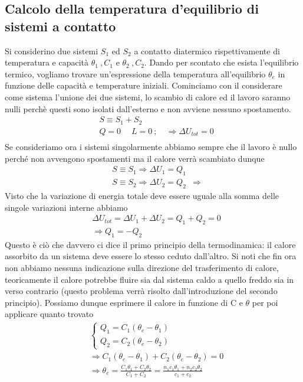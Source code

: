 \documentclass[10pt,a4paper]{article}
\begin{document}
\subsection{Calcolo della temperatura d'equilibrio di sistemi a contatto}
Si considerino due sistemi $S_1$ ed $S_2$ a contatto diatermico rispettivamente di temperatura e capacità $\theta_1\ , C_1$ e  $\theta_2\ , C_2$. Dando per scontato che esista l'equilibrio termico, vogliamo trovare un'espressione della temperatura all'equilibrio $\theta_e$ in funzione delle capacità e temperature iniziali. Cominciamo con il considerare come sistema l'unione dei due sistemi, lo scambio di calore ed il lavoro saranno nulli perchè questi sono isolati dall'esterno e non avviene nessuno spostamento. 
\begin{align*} 
&S \equiv S_1 + S_2\\
&Q = 0\;\quad L=0\ ; \quad \Rightarrow \Delta U_{tot} = 0\\
\end{align*} 
Se consideriamo ora i sistemi singolarmente abbiamo sempre che il lavoro è nullo perché non avvengono spostamenti ma il calore verrà scambiato dunque
\begin{align*} 
&S \equiv S_1 \Rightarrow \Delta U_1 = Q_1\\
&S\equiv S_2 \Rightarrow  \Delta U_2 = Q_2
&\Rightarrow 
\end{align*} 
Visto che la variazione di energia totale deve essere uguale alla somma delle singole variazioni interne abbiamo
\begin{align*} 
&\Delta U_{tot} = \Delta U_1 + \Delta U_2 = Q_1+Q_2 = 0\\
&\Rightarrow Q_1 = -Q_2 
\end{align*}  
Questo è ciò che davvero ci dice il primo principio della termodinamica: il calore assorbito da un sistema deve essere lo stesso ceduto dall'altro. Si noti che fin ora non abbiamo nessuna indicazione sulla direzione del trasferimento di calore, teoricamente il calore potrebbe fluire sia dal sistema caldo a quello freddo sia in verso contrario (questo problema verrà risolto dall'introduzione del secondo principio). Possiamo dunque esprimere il calore in funzione di C e $\theta$ per poi applicare quanto trovato
\begin{align*} 
&\begin{cases}
	Q_1 = C_1 (\theta_e-\theta_1)\\
	Q_2 = C_2 (\theta_e-\theta_2)
\end{cases}\\
&\Rightarrow C_1 (\theta_e-\theta_1) + C_2 (\theta_e-\theta_2) = 0\\
&\Rightarrow \theta_e = \frac{C_1\theta_1+C_2\theta_2}{C_1+C_2} =  \frac{n_1 c_1\theta_1+n_2 c_2\theta_2}{c_1 + c_2}
\end{align*} 
\end{document}
